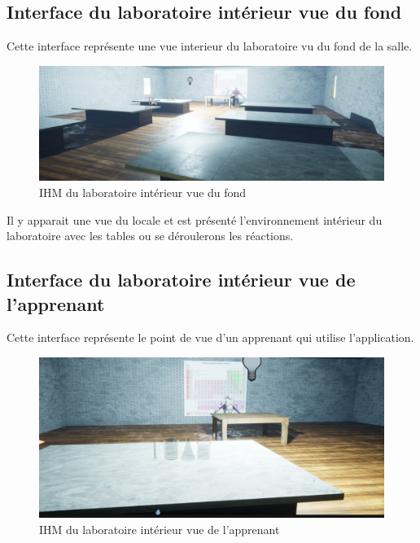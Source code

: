 \subsection{Interface du laboratoire intérieur vue du fond}

Cette interface représente une vue interieur du laboratoire vu du fond de la salle.

\begin{figure}[H]
	\centering
	\includegraphics[width=1\textwidth]{img/labo1}
	\caption{IHM du laboratoire intérieur vue du fond}
	\label{fig:mesh1}
\end{figure}

Il y apparait une vue du locale et est présenté l'environnement intérieur du laboratoire avec les tables ou se déroulerons les réactions.

\subsection{Interface du laboratoire intérieur vue de l'apprenant}

Cette interface représente le point de vue d'un apprenant qui utilise l'application.

\begin{figure}[H]
	\centering
	\includegraphics[width=1\textwidth]{img/labo2}
	\caption{IHM du laboratoire intérieur vue de l'apprenant}
	\label{fig:mesh1}
\end{figure}

